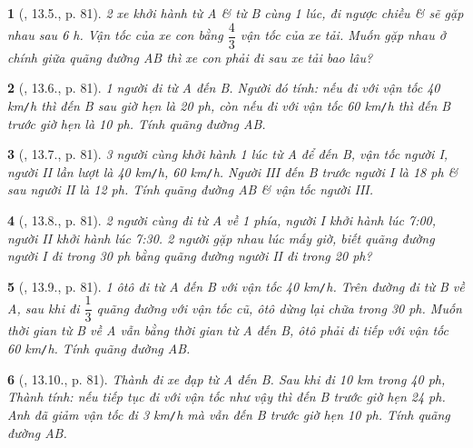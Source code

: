 \documentclass{article}
\newtheorem{baitoan}{}
\begin{document}
\begin{baitoan}[\cite{TLCT_THCS_Toan_6_so_hoc}, 13.5., p. 81]
	2 xe khởi hành từ A \& từ B cùng 1 lúc, đi ngược chiều \& sẽ gặp nhau sau {\rm6 h}. Vận tốc của xe con bằng $\dfrac{4}{3}$ vận tốc của xe tải. Muốn gặp nhau ở chính giữa quãng đường AB thì xe con phải đi sau xe tải bao lâu?
\end{baitoan}

\begin{baitoan}[\cite{TLCT_THCS_Toan_6_so_hoc}, 13.6., p. 81]
	1 người đi từ A đến B. Người đó tính: nếu đi với vận tốc {\rm40 km{\tt/}h} thì đến B sau giờ hẹn là {\rm20 ph}, còn nếu đi với vận tốc {\rm60 km{\tt/}h} thì đến B trước giờ hẹn là {\rm10 ph}. Tính quãng đường AB.
\end{baitoan}

\begin{baitoan}[\cite{TLCT_THCS_Toan_6_so_hoc}, 13.7., p. 81]
	3 người cùng khởi hành 1 lúc từ A để đến B, vận tốc người I, người II lần lượt là {\rm40 km{\tt/}h, 60 km{\tt/}h}. Người III đến B trước người I là {\rm18 ph} \& sau người II là {\rm12 ph}. Tính quãng đường AB \& vận tốc người III. 
\end{baitoan}

\begin{baitoan}[\cite{TLCT_THCS_Toan_6_so_hoc}, 13.8., p. 81]
	2 người cùng đi từ A về 1 phía, người I khởi hành lúc {\rm7:00}, người II khởi hành lúc {\rm7:30}. 2 người gặp nhau lúc mấy giờ, biết quãng đường người I đi trong {\rm30 ph} bằng quãng đường người II đi trong {\rm20 ph}?
\end{baitoan}

\begin{baitoan}[\cite{TLCT_THCS_Toan_6_so_hoc}, 13.9., p. 81]
	1 ôtô đi từ A đến B với vận tốc {\rm40 km{\tt/}h}. Trên đường đi từ B về A, sau khi đi $\dfrac{1}{3}$ quãng đường với vận tốc cũ, ôtô dừng lại chữa trong {\rm30 ph}. Muốn thời gian từ B về A vẫn bằng thời gian từ A đến B, ôtô phải đi tiếp với vận tốc {\rm60 km{\tt/}h}. Tính quãng đường AB.
\end{baitoan}

\begin{baitoan}[\cite{TLCT_THCS_Toan_6_so_hoc}, 13.10., p. 81]
	Thành đi xe đạp từ A đến B. Sau khi đi {\rm10 km} trong {\rm40 ph}, Thành tính: nếu tiếp tục đi với vận tốc như vậy thì đến B trước giờ hẹn {\rm24 ph}. Anh đã giảm vận tốc đi {\rm3 km{\tt/}h} mà vẫn đến B trước giờ hẹn {\rm10 ph}. Tính quãng đường AB.
\end{baitoan}
\end{document}
